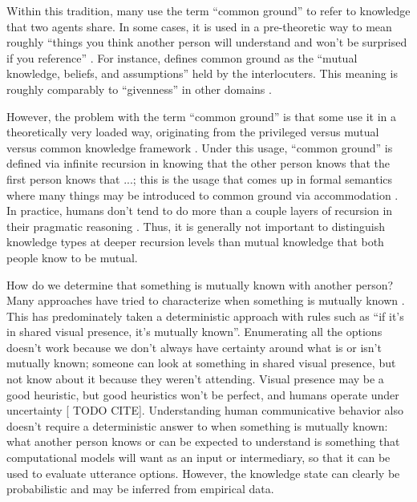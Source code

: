 \documentclass[]{article}
\begin{document}
Within this tradition, many use the term ``common ground'' to refer to knowledge that two agents share. In some cases, it is used in a pre-theoretic way to mean roughly ``things you think another person will understand and won't be surprised if you reference'' \citep{leung2023, garrison2022}. For instance,  \citet{hanna2003} defines common ground as the ``mutual knowledge, beliefs, and assumptions'' held by the interlocuters. This meaning is roughly comparably to ``givenness'' in other domains \citep{fay2010}. 

 However, the problem with the term ``common ground'' is that some use it in a theoretically very loaded way, originating from the privileged versus mutual versus common knowledge framework \citep{clark1996}. Under this usage, ``common ground'' is defined via infinite recursion in knowing that the other person knows that the first person knows that ...; this is the usage that comes up in formal semantics where many things may be introduced to common ground via accommodation \citep{horton1996, pickering2004}. In practice, humans don't tend to do more than a couple layers of recursion in their pragmatic reasoning \citep{franke2016}. Thus, it is generally not important to distinguish knowledge types at deeper recursion levels than mutual knowledge that both people know to be mutual. 

How do we determine that something is mutually known with another person? Many approaches have tried to characterize when something is mutually known \citep{horton1996,clark1996, brown-schmidt2012}. This has predominately taken a deterministic approach with rules such as ``if it's in shared visual presence, it's mutually known''. Enumerating all the options doesn't work because we don't always have certainty around what is or isn't mutually known; someone can look at something in shared visual presence, but not know about it because they weren't attending. Visual presence may be a good heuristic, but good heuristics won't be perfect, and humans operate under uncertainty [ TODO CITE]. Understanding human communicative behavior also doesn't require a deterministic answer to when something is mutually known: what another person knows or can be expected to understand is something that computational models will want as an input or intermediary, so that it can be used to evaluate utterance options. However, the knowledge state can clearly be probabilistic and may be inferred from empirical data. 


\end{document}
